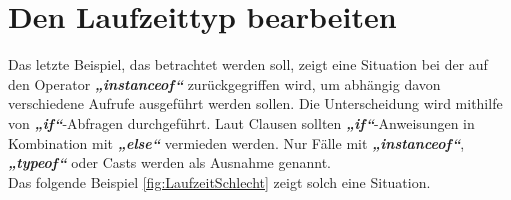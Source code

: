 \section{Den Laufzeittyp bearbeiten}
Das letzte Beispiel, das betrachtet werden soll, zeigt eine Situation bei der auf den Operator \textit{\textbf{„instanceof“}} zurückgegriffen wird, um abhängig davon verschiedene Aufrufe ausgeführt werden sollen.
Die Unterscheidung wird mithilfe von \textit{\textbf{„if“}}-Abfragen durchgeführt. Laut Clausen sollten \textit{\textbf{„if“}}-Anweisungen in Kombination mit \textit{\textbf{„else“}} vermieden werden.
Nur Fälle mit \textit{\textbf{„instanceof“}}, \textit{\textbf{„typeof“}} oder Casts werden als Ausnahme genannt. \citep[S. 332]{fiveLines.2023}\\
Das folgende Beispiel \ref{fig:LaufzeitSchlecht} zeigt solch eine Situation.

